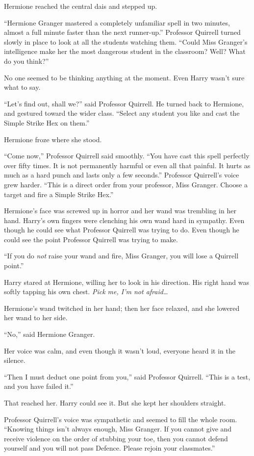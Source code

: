 Hermione reached the central dais and stepped up.

``Hermione Granger mastered a completely unfamiliar spell in two
minutes, almost a full minute faster than the next runner-up.''
Professor Quirrell turned slowly in place to look at all the students
watching them. ``Could Miss Granger's intelligence make her the most
dangerous student in the classroom? Well? What do you think?''

No one seemed to be thinking anything at the moment. Even Harry wasn't
sure what to say.

``Let's find out, shall we?'' said Professor Quirrell. He turned back to
Hermione, and gestured toward the wider class. ``Select any student you
like and cast the Simple Strike Hex on them.''

Hermione froze where she stood.

``Come now,'' Professor Quirrell said smoothly. ``You have cast this
spell perfectly over fifty times. It is not permanently harmful or even
all that painful. It hurts as much as a hard punch and lasts only a few
seconds.'' Professor Quirrell's voice grew harder. ``This is a direct
order from your professor, Miss Granger. Choose a target and fire a
Simple Strike Hex.''

Hermione's face was screwed up in horror and her wand was trembling in
her hand. Harry's own fingers were clenching his own wand hard in
sympathy. Even though he could see what Professor Quirrell was trying to
do. Even though he could see the point Professor Quirrell was trying to
make.

``If you do \emph{not} raise your wand and fire, Miss Granger, you will
lose a Quirrell point.''

Harry stared at Hermione, willing her to look in his direction. His
right hand was softly tapping his own chest. \emph{Pick me, I'm not
afraid\ldots{}}

Hermione's wand twitched in her hand; then her face relaxed, and she
lowered her wand to her side.

``No,'' said Hermione Granger.

Her voice was calm, and even though it wasn't loud, everyone heard it in
the silence.

``Then I must deduct one point from you,'' said Professor Quirrell.
``This is a test, and you have failed it.''

That reached her. Harry could see it. But she kept her shoulders
straight.

Professor Quirrell's voice was sympathetic and seemed to fill the whole
room. ``Knowing things isn't always enough, Miss Granger. If you cannot
give and receive violence on the order of stubbing your toe, then you
cannot defend yourself and you will not pass Defence. Please rejoin your
classmates.''

